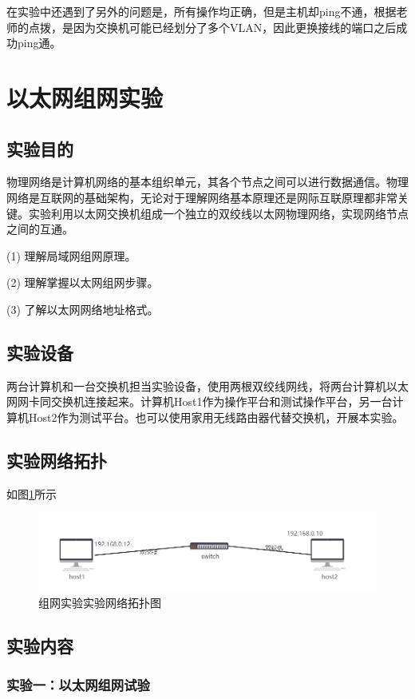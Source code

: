 \documentclass[lang=cn,11pt,a4paper,cite=authoryear]{elegantpaper}
\begin{document}
在实验中还遇到了另外的问题是，所有操作均正确，但是主机却ping不通，根据老师的点拨，是因为交换机可能已经划分了多个VLAN，因此更换接线的端口之后成功ping通。
\section{以太网组网实验}
\subsection{实验目的}

物理网络是计算机网络的基本组织单元，其各个节点之间可以进行数据通信。物理网络是互联网的基础架构，无论对于理解网络基本原理还是网际互联原理都非常关键。实验利用以太网交换机组成一个独立的双绞线以太网物理网络，实现网络节点之间的互通。

(1)	理解局域网组网原理。

(2)	理解掌握以太网组网步骤。

(3)	了解以太网网络地址格式。

\subsection{实验设备}

两台计算机和一台交换机担当实验设备，使用两根双绞线网线，将两台计算机以太网网卡同交换机连接起来。计算机Host1作为操作平台和测试操作平台，另一台计算机Host2作为测试平台。也可以使用家用无线路由器代替交换机，开展本实验。

\subsection{实验网络拓扑}

如图\ref{fig:screenshot015}所示

\begin{figure}[htbp]
	\centering
	\includegraphics[width=0.7\linewidth]{image/screenshot015}
	\caption{组网实验实验网络拓扑图}
	\label{fig:screenshot015}
\end{figure}

\subsection{实验内容}

\subsubsection{实验一：以太网组网试验}
\end{document}
